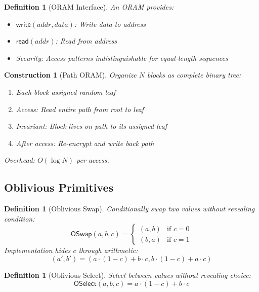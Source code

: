 \documentclass[11pt,final]{article}
\newcommand{\Read}{\mathsf{read}}
\newcommand{\Write}{\mathsf{write}}
\newtheorem{definition}[theorem]{Definition}
\newtheorem{construction}[theorem]{Construction}
\begin{document}
\begin{definition}[ORAM Interface]
An ORAM provides:
\begin{itemize}
    \item $\Write(addr, data)$: Write data to address
    \item $\Read(addr)$: Read from address
    \item Security: Access patterns indistinguishable for equal-length sequences
\end{itemize}
\end{definition}

\begin{construction}[Path ORAM]
Organize $N$ blocks as complete binary tree:
\begin{enumerate}
    \item Each block assigned random leaf
    \item Access: Read entire path from root to leaf
    \item Invariant: Block lives on path to its assigned leaf
    \item After access: Re-encrypt and write back path
\end{enumerate}
Overhead: $O(\log N)$ per access.
\end{construction}

\subsection{Oblivious Primitives}

\begin{definition}[Oblivious Swap]
Conditionally swap two values without revealing condition:
\begin{equation}
\mathsf{OSwap}(a, b, c) = \begin{cases}
(a, b) & \text{if } c = 0\\
(b, a) & \text{if } c = 1
\end{cases}
\end{equation}
Implementation hides $c$ through arithmetic:
\begin{equation}
(a', b') = (a \cdot (1-c) + b \cdot c, b \cdot (1-c) + a \cdot c)
\end{equation}
\end{definition}

\begin{definition}[Oblivious Select]
Select between values without revealing choice:
\begin{equation}
\mathsf{OSelect}(a, b, c) = a \cdot (1-c) + b \cdot c
\end{equation}
\end{definition}
\end{document}
